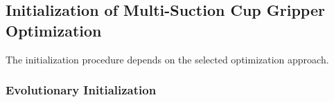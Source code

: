 


\subsection{Initialization of Multi-Suction Cup Gripper Optimization}

The initialization procedure depends on the selected optimization approach.

\subsubsection{Evolutionary Initialization}

